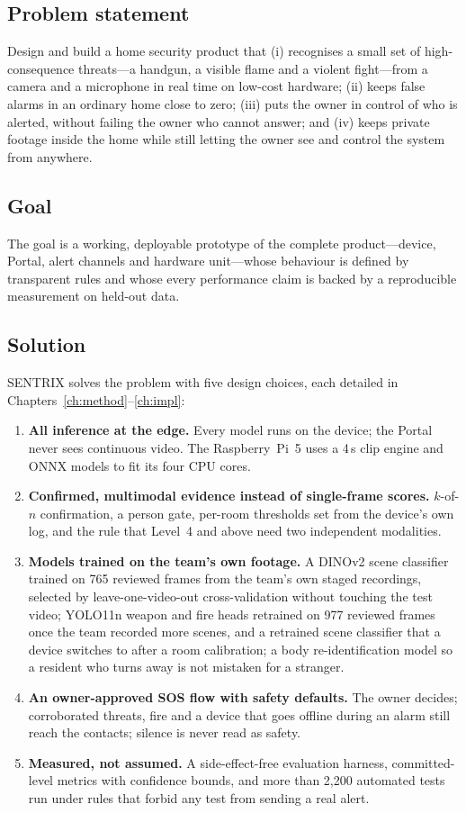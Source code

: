 \subsection{Problem statement}
Design and build a home security product that (i) recognises a small set of high-consequence threats---a handgun, a visible flame and a violent fight---from a camera and a microphone in real time on low-cost hardware; (ii) keeps false alarms in an ordinary home close to zero; (iii) puts the owner in control of who is alerted, without failing the owner who cannot answer; and (iv) keeps private footage inside the home while still letting the owner see and control the system from anywhere.

\subsection{Goal}
The goal is a working, deployable prototype of the complete product---device, Portal, alert channels and hardware unit---whose behaviour is defined by transparent rules and whose every performance claim is backed by a reproducible measurement on held-out data.

\subsection{Solution}
SENTRIX solves the problem with five design choices, each detailed in Chapters~\ref{ch:method}--\ref{ch:impl}:
\begin{enumerate}
\item \textbf{All inference at the edge.} Every model runs on the device; the Portal never sees continuous video. The Raspberry~Pi~5 uses a 4\,s clip engine and ONNX models to fit its four CPU cores.
\item \textbf{Confirmed, multimodal evidence instead of single-frame scores.} $k$-of-$n$ confirmation, a person gate, per-room thresholds set from the device's own log, and the rule that Level~4 and above need two independent modalities.
\item \textbf{Models trained on the team's own footage.} A DINOv2 scene classifier trained on 765 reviewed frames from the team's own staged recordings, selected by leave-one-video-out cross-validation without touching the test video; YOLO11n weapon and fire heads retrained on 977 reviewed frames once the team recorded more scenes, and a retrained scene classifier that a device switches to after a room calibration; a body re-identification model so a resident who turns away is not mistaken for a stranger.
\item \textbf{An owner-approved SOS flow with safety defaults.} The owner decides; corroborated threats, fire and a device that goes offline during an alarm still reach the contacts; silence is never read as safety.
\item \textbf{Measured, not assumed.} A side-effect-free evaluation harness, committed-level metrics with confidence bounds, and more than 2,200 automated tests run under rules that forbid any test from sending a real alert.
\end{enumerate}

